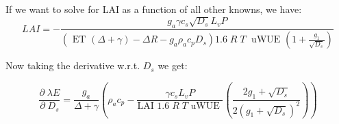 If we want to solve for LAI as a function of all other knowns, we have:
\begin{equation}
LAI  = - \frac{g_a \gamma c_s \sqrt{D_s} L_v P }{ \left(\text{ ET } ( \Delta + \gamma) - \Delta R - g_a \rho_a c_p D_{s}\right) 1.6 \; R\; T\; \text{ uWUE } (1 + \frac{g_1}{\sqrt{D_s}})}
\end{equation}

Now taking the derivative w.r.t. $D_s$ we get:

\begin{equation}
\frac{\partial \;  \lambda E}{\partial \; D_s} = \frac{g_a}{\Delta + \gamma}   \left( \rho_a c_p - \frac{\gamma c_s L_v  P }{\text{LAI }1.6 \; R\; T \text{ uWUE }} \left( \frac{2 g_1 + \sqrt{D_s}}{2 (g_1 + \sqrt{D_s})^2}\right) \right)
\end{equation}




